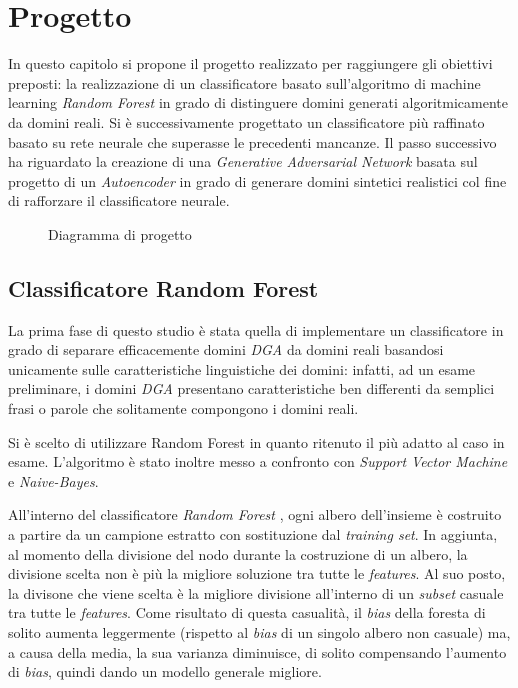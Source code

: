 \chapter{Progetto}
\label{progetto}

In questo capitolo si propone il progetto realizzato per raggiungere gli obiettivi preposti: la realizzazione di un classificatore basato sull'algoritmo di machine learning \textit{Random Forest} in grado di distinguere domini generati algoritmicamente da domini reali. Si è successivamente progettato un classificatore più raffinato basato su rete neurale che superasse le precedenti mancanze. Il passo successivo ha riguardato la creazione di una \textit{Generative Adversarial Network} basata sul progetto di un \textit{Autoencoder} in grado di generare domini sintetici realistici col fine di rafforzare il classificatore neurale.

\begin{figure}[htb]
    \centering
	
\label{fig:intro}
\caption{Diagramma di progetto}
\end{figure}


\section{Classificatore Random Forest}
\label{randomforest}
La prima fase di questo studio è stata quella di implementare un classificatore in grado di separare efficacemente domini \textit{DGA} da domini reali basandosi unicamente sulle caratteristiche linguistiche dei domini: infatti, ad un esame preliminare, i domini \textit{DGA} presentano caratteristiche ben differenti da semplici frasi o parole che solitamente compongono i domini reali.

Si è scelto di utilizzare Random Forest in quanto ritenuto il più adatto al caso in esame. L'algoritmo è stato inoltre messo a confronto con \textit{Support Vector Machine} e \textit{Naive-Bayes}. 

All'interno del classificatore \textit{Random Forest} \cite{randomforest}, ogni albero dell'insieme è costruito a partire da un campione estratto con sostituzione dal \textit{training set}. In aggiunta, al momento della divisione del nodo durante la costruzione di un albero, la divisione scelta non è più la migliore soluzione tra tutte le \textit{features}. Al suo posto, la divisone che viene scelta è la migliore divisione all'interno di un \textit{subset} casuale tra tutte le \textit{features}. Come risultato di questa casualità, il \textit{bias} della foresta di solito aumenta leggermente (rispetto al \textit{bias} di un singolo albero non casuale) ma, a causa della media, la sua varianza diminuisce, di solito compensando l'aumento di \textit{bias}, quindi dando un modello generale migliore.

